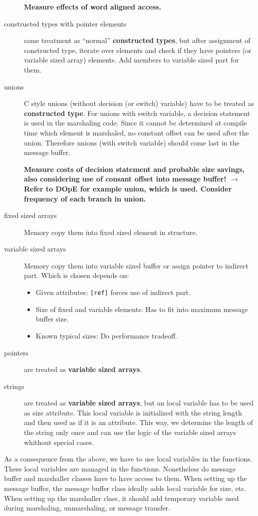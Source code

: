\begin{description}
  \textbf{Measure effects of word aligned access.}

\item[constructed types with pointer elements] same treatment as ``normal''
  \textbf{constructed types}, but after assignment of constructed type,
  iterate over elements and check if they have pointers (or variable sized
  array) elements.  Add members to variable sized part for them.

\item[unions] C style unions (without decision (or switch) variable) have to
  be treated as \textbf{constructed type}.  For unions with switch variable,
  a decision statement is used in the marshaling code. Since it cannot be 
  determined at compile time which element is marshaled, no constant offset
  can be used after the union.  Therefore unions (with switch variable) should
  come last in the message buffer.

  \textbf{Measure costs of decision statement and probable size savings, also
  considering use of consant offset into message buffer! $\rightarrow$ Refer
  to DOpE for example union, which is used.  Consider frequency of each branch
  in union.}

\item[fixed sized arrays] Memory copy them into fixed sized element in 
  structure.

\item[variable sized arrays] Memory copy them into variable sized buffer or
  assign pointer to indirect part.  Which is chosen depends on:
  \begin{itemize}
  \item Given attributes: \verb|[ref]| forces use of indirect part.
  \item Size of fixed and variable elements: Has to fit into maximum message 
    buffer size.
  \item Known typical sizes: Do performance tradeoff.
  \end{itemize}

\item[pointers] are treated as \textbf{variable sized arrays}.

\item[strings] are treated as \textbf{variable sized arrays}, but an local 
  variable has to be used as size attribute.  This local variable is 
  initialized with the string length and then used as if it is an attribute.  
  This way, we determine the length of the string only once and can use the 
  logic of the variable sized arrays whithout special cases.
  
\end{description}

As a consequence from the above, we have to use local variables in the
functions.  These local variables are managed in the functions.  Nonetheless
do message buffer and marshaller classes have to have access to them.  When
setting up the message buffer, the message buffer class ideally adds local
variable for size, etc.  When setting up the marshaller class, it should add
temporary variable used during marshaling, unmarshaling, or message transfer.

